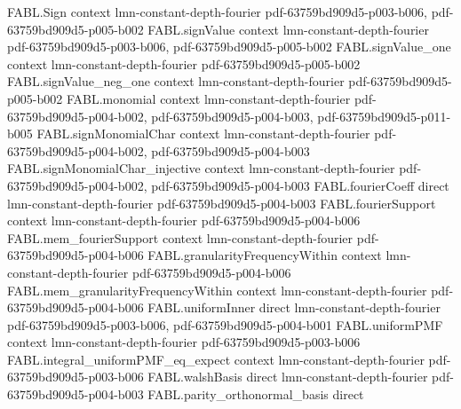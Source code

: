 \begin{theorem}
\label{FABL.FiniteFourierBasis.sum_orthogonalComponent}
\leanok
{}
\proofstep
  {FABL.Sign}
  {context}
  {lmn-constant-depth-fourier}
  {pdf-63759bd909d5-p003-b006,
    pdf-63759bd909d5-p005-b002}
\proofstep
  {FABL.signValue}
  {context}
  {lmn-constant-depth-fourier}
  {pdf-63759bd909d5-p003-b006,
    pdf-63759bd909d5-p005-b002}
\proofstep
  {FABL.signValue_one}
  {context}
  {lmn-constant-depth-fourier}
  {pdf-63759bd909d5-p005-b002}
\proofstep
  {FABL.signValue_neg_one}
  {context}
  {lmn-constant-depth-fourier}
  {pdf-63759bd909d5-p005-b002}
\proofstep
  {FABL.monomial}
  {context}
  {lmn-constant-depth-fourier}
  {pdf-63759bd909d5-p004-b002,
    pdf-63759bd909d5-p004-b003,
    pdf-63759bd909d5-p011-b005}
\proofstep
  {FABL.signMonomialChar}
  {context}
  {lmn-constant-depth-fourier}
  {pdf-63759bd909d5-p004-b002,
    pdf-63759bd909d5-p004-b003}
\proofstep
  {FABL.signMonomialChar_injective}
  {context}
  {lmn-constant-depth-fourier}
  {pdf-63759bd909d5-p004-b002,
    pdf-63759bd909d5-p004-b003}
\proofstep
  {FABL.fourierCoeff}
  {direct}
  {lmn-constant-depth-fourier}
  {pdf-63759bd909d5-p004-b003}
\proofstep
  {FABL.fourierSupport}
  {context}
  {lmn-constant-depth-fourier}
  {pdf-63759bd909d5-p004-b006}
\proofstep
  {FABL.mem_fourierSupport}
  {context}
  {lmn-constant-depth-fourier}
  {pdf-63759bd909d5-p004-b006}
\proofstep
  {FABL.granularityFrequencyWithin}
  {context}
  {lmn-constant-depth-fourier}
  {pdf-63759bd909d5-p004-b006}
\proofstep
  {FABL.mem_granularityFrequencyWithin}
  {context}
  {lmn-constant-depth-fourier}
  {pdf-63759bd909d5-p004-b006}
\proofstep
  {FABL.uniformInner}
  {direct}
  {lmn-constant-depth-fourier}
  {pdf-63759bd909d5-p003-b006,
    pdf-63759bd909d5-p004-b001}
\proofstep
  {FABL.uniformPMF}
  {context}
  {lmn-constant-depth-fourier}
  {pdf-63759bd909d5-p003-b006}
\proofstep
  {FABL.integral_uniformPMF_eq_expect}
  {context}
  {lmn-constant-depth-fourier}
  {pdf-63759bd909d5-p003-b006}
\proofstep
  {FABL.walshBasis}
  {direct}
  {lmn-constant-depth-fourier}
  {pdf-63759bd909d5-p004-b003}
\proofstep
  {FABL.parity_orthonormal_basis}
  {direct}

\end{theorem}
